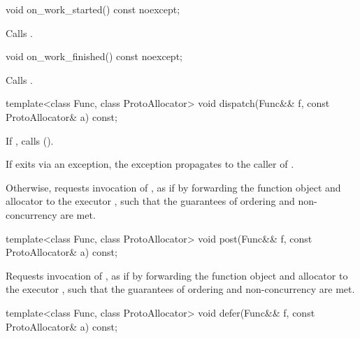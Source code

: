 %
\begin{itemdecl}
void on_work_started() const noexcept;
\end{itemdecl}

\begin{itemdescr}
\pnum
\effects Calls .
\end{itemdescr}

%
\begin{itemdecl}
void on_work_finished() const noexcept;
\end{itemdecl}

\begin{itemdescr}
\pnum
\effects Calls .
\end{itemdescr}

%
\begin{itemdecl}
template<class Func, class ProtoAllocator>
  void dispatch(Func&& f, const ProtoAllocator& a) const;
\end{itemdecl}

\begin{itemdescr}
\pnum
\effects If , calls  (). \begin{note} If  exits via an exception, the exception propagates to the caller of . \end{note} Otherwise, requests invocation of , as if by forwarding the function object  and allocator  to the executor , such that the guarantees of ordering and non-concurrency are met.
\end{itemdescr}

%
\begin{itemdecl}
template<class Func, class ProtoAllocator>
  void post(Func&& f, const ProtoAllocator& a) const;
\end{itemdecl}

\begin{itemdescr}
\pnum
\effects Requests invocation of , as if by forwarding the function object  and allocator  to the executor , such that the guarantees of ordering and non-concurrency are met.
\end{itemdescr}

%
\begin{itemdecl}
template<class Func, class ProtoAllocator>
  void defer(Func&& f, const ProtoAllocator& a) const;
\end{itemdecl}

